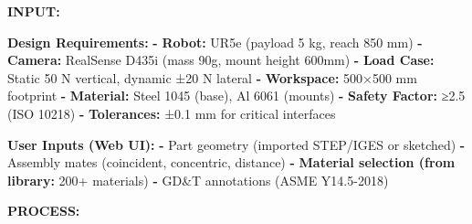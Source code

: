 \documentclass[
]{article}
\newenvironment{Shaded}{\begin{snugshade}}{\end{snugshade}}
\newcommand{\AttributeTok}[1]{\textcolor[rgb]{0.13,0.29,0.53}{#1}}
\newcommand{\FunctionTok}[1]{\textcolor[rgb]{0.13,0.29,0.53}{\textbf{#1}}}
\newcommand{\KeywordTok}[1]{\textcolor[rgb]{0.13,0.29,0.53}{\textbf{#1}}}
\begin{document}
\textbf{INPUT:}

\begin{Shaded}
\begin{Highlighting}[]
\FunctionTok{Design Requirements}\KeywordTok{:}
\AttributeTok{  }\KeywordTok{{-}}\AttributeTok{ }\FunctionTok{Robot}\KeywordTok{:}\AttributeTok{ UR5e (payload 5 kg, reach 850 mm)}
\AttributeTok{  }\KeywordTok{{-}}\AttributeTok{ }\FunctionTok{Camera}\KeywordTok{:}\AttributeTok{ RealSense D435i (mass 90g, mount height 600mm)}
\AttributeTok{  }\KeywordTok{{-}}\AttributeTok{ }\FunctionTok{Load Case}\KeywordTok{:}\AttributeTok{ Static 50 N vertical, dynamic ±20 N lateral}
\AttributeTok{  }\KeywordTok{{-}}\AttributeTok{ }\FunctionTok{Workspace}\KeywordTok{:}\AttributeTok{ 500×500 mm footprint}
\AttributeTok{  }\KeywordTok{{-}}\AttributeTok{ }\FunctionTok{Material}\KeywordTok{:}\AttributeTok{ Steel 1045 (base), Al 6061 (mounts)}
\AttributeTok{  }\KeywordTok{{-}}\AttributeTok{ }\FunctionTok{Safety Factor}\KeywordTok{:}\AttributeTok{ ≥2.5 (ISO 10218)}
\AttributeTok{  }\KeywordTok{{-}}\AttributeTok{ }\FunctionTok{Tolerances}\KeywordTok{:}\AttributeTok{ ±0.1 mm for critical interfaces}

\FunctionTok{User Inputs (Web UI)}\KeywordTok{:}
\AttributeTok{  }\KeywordTok{{-}}\AttributeTok{ Part geometry (imported STEP/IGES or sketched)}
\AttributeTok{  }\KeywordTok{{-}}\AttributeTok{ Assembly mates (coincident, concentric, distance)}
\AttributeTok{  }\KeywordTok{{-}}\AttributeTok{ }\FunctionTok{Material selection (from library}\KeywordTok{:}\AttributeTok{ 200+ materials)}
\AttributeTok{  }\KeywordTok{{-}}\AttributeTok{ GD\&T annotations (ASME Y14.5{-}2018)}
\end{Highlighting}
\end{Shaded}

\textbf{PROCESS:}
\end{document}
